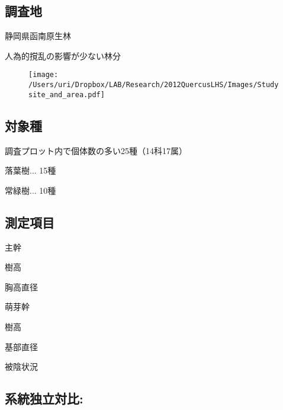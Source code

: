 \documentclass[a0, 36pt, plainboxedsections]{sciposter} %
\begin{document}
\begin{multicols}{3}\footnotesize{

\subsection*{調査地}

静岡県函南原生林

人為的撹乱の影響が少ない林分

\begin{figure}
  \texttt{[image: /Users/uri/Dropbox/LAB/Research/2012QuercusLHS/Images/Studysite\_and\_area.pdf]}
\end{figure}

\subsection*{対象種}

調査プロット内で個体数の多い25種（14科17属）

\begin{list}{}{\setlength{\itemindent}{1em}}
  \item 落葉樹... 15種
  \item 常緑樹... 10種
\end{list}

\columnbreak
\subsection*{測定項目}
主幹

\begin{list}{}{\setlength{\itemindent}{1em}}
  \item 樹高
  \item 胸高直径
\end{list}

萌芽幹


\begin{list}{}{\setlength{\itemindent}{1em}}
  \item 樹高
  \item 基部直径
  \item 被陰状況
\end{list}


\subsection*{系統独立対比: }

}\end{multicols}


\end{document}
